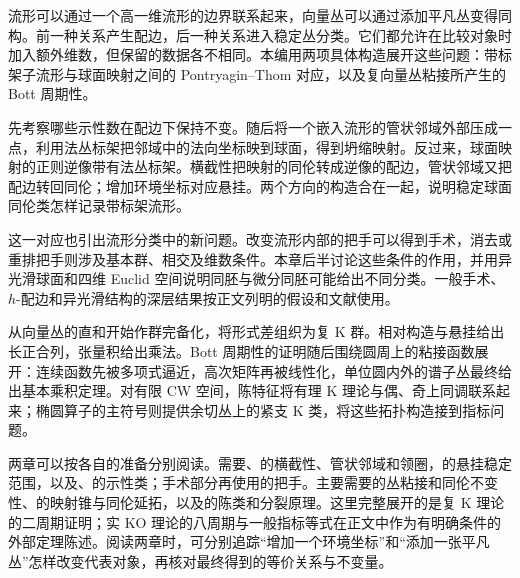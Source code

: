 
% 

\BookPartGuide
流形可以通过一个高一维流形的边界联系起来，向量丛可以通过添加平凡丛变得同构。前一种关系产生配边，后一种关系进入稳定丛分类。它们都允许在比较对象时加入额外维数，但保留的数据各不相同。本编用两项具体构造展开这些问题：带标架子流形与球面映射之间的 Pontryagin--Thom 对应，以及复向量丛粘接所产生的 Bott 周期性。

\ProseParagraphBreak

先考察哪些示性数在配边下保持不变。随后将一个嵌入流形的管状邻域外部压成一点，利用法丛标架把邻域中的法向坐标映到球面，得到坍缩映射。反过来，球面映射的正则逆像带有法丛标架。横截性把映射的同伦转成逆像的配边，管状邻域又把配边转回同伦；增加环境坐标对应悬挂。两个方向的构造合在一起，说明稳定球面同伦类怎样记录带标架流形。

\ProseParagraphBreak

这一对应也引出流形分类中的新问题。改变流形内部的把手可以得到手术，消去或重排把手则涉及基本群、相交及维数条件。本章后半讨论这些条件的作用，并用异光滑球面和四维 Euclid 空间说明同胚与微分同胚可能给出不同分类。一般手术、\(h\)-配边和异光滑结构的深层结果按正文列明的假设和文献使用。

\ProseParagraphBreak

从向量丛的直和开始作群完备化，将形式差组织为复 K 群。相对构造与悬挂给出长正合列，张量积给出乘法。Bott 周期性的证明随后围绕圆周上的粘接函数展开：连续函数先被多项式逼近，高次矩阵再被线性化，单位圆内外的谱子丛最终给出基本乘积定理。对有限 CW 空间，陈特征将有理 K 理论与偶、奇上同调联系起来；椭圆算子的主符号则提供余切丛上的紧支 K 类，将这些拓扑构造接到指标问题。

\ProseParagraphBreak

两章可以按各自的准备分别阅读。需要、的横截性、管状邻域和领圈，的悬挂稳定范围，以及、的示性类；手术部分再使用的把手。主要需要的丛粘接和同伦不变性、的映射锥与同伦延拓，以及的陈类和分裂原理。这里完整展开的是复 K 理论的二周期证明；实 KO 理论的八周期与一般指标等式在正文中作为有明确条件的外部定理陈述。阅读两章时，可分别追踪“增加一个环境坐标”和“添加一张平凡丛”怎样改变代表对象，再核对最终得到的等价关系与不变量。



